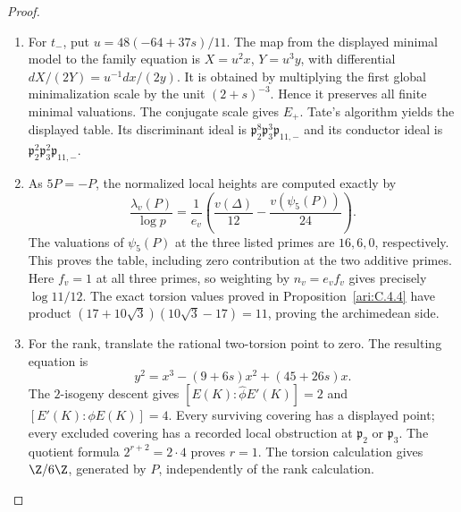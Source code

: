 \begin{proof}
\begin{enumerate}[label=\arabic*.,leftmargin=*]
\item For $t_-$, put $u=48(-64+37s)/11$.
The map from the displayed minimal model to the family equation is
$X=u^2x$, $Y=u^3y$, with differential
$dX/(2Y)=u^{-1}dx/(2y)$.
It is obtained by multiplying the first global minimalization
scale by the unit $(2+s)^{-3}$. Hence it preserves all finite
minimal valuations. The conjugate scale gives $E_+$.
Tate's algorithm yields the displayed table. Its discriminant
ideal is
$\mathfrak p_2^8\mathfrak p_3^3\mathfrak p_{11,-}$ and its
conductor ideal is
$\mathfrak p_2^2\mathfrak p_3^2\mathfrak p_{11,-}$.

\item As $5P=-P$, the normalized local heights are computed exactly by
\[
 \frac{\lambda_v(P)}{\log p}
 =\frac1{e_v}\left(\frac{v(\Delta)}{12}
                         -\frac{v(\psi_5(P))}{24}\right).
\]
The valuations of $\psi_5(P)$ at the three listed primes are
$16,6,0$, respectively. This proves the table, including zero
contribution at the two additive primes. Here $f_v=1$ at all
three primes, so weighting by $n_v=e_vf_v$ gives precisely
$\log11/12$. The exact torsion values proved in Proposition~\ref{ari:C.4.4} have product
$(17+10\sqrt3)(10\sqrt3-17)=11$, proving the archimedean side.

\item For the rank, translate the rational two-torsion point to zero.
The resulting equation is
\[
 y^2=x^3-(9+6s)x^2+(45+26s)x.
\]
The $2$-isogeny descent gives
$[E(K):\widehat\phi E'(K)]=2$ and
$[E'(K):\phi E(K)]=4$. Every surviving covering has a
displayed point; every excluded covering has a recorded local
obstruction at $\mathfrak p_2$ or $\mathfrak p_3$.
The quotient formula $2^{r+2}=2\cdot4$ proves $r=1$.
The torsion calculation
gives $\Z/6\Z$, generated by $P$, independently of the rank
calculation.
\end{enumerate}
\end{proof}